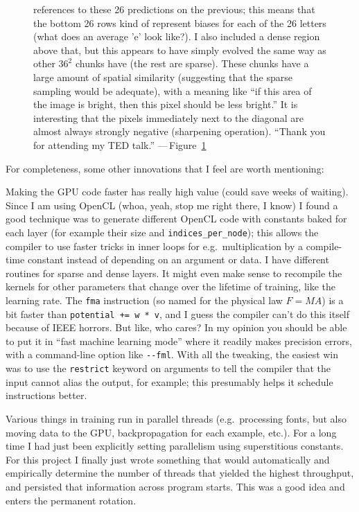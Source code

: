\documentclass[twocolumn]{article}
\begin{document}
\begin{figure}[ht!b]
{    references to these 26 predictions on the previous; this means
    that the bottom 26 rows kind of represent biases for each of the 26
    letters (what does an average 'e' look like?). I also included a
    dense region above that, but this appears to have simply evolved
    the same way as other $36^2$ chunks have (the rest are sparse).
    These chunks have a large amount of spatial similarity (suggesting
    that the sparse sampling would be adequate), with a meaning like
    ``if this area of the image is bright, then this pixel should
    be less bright.'' It is interesting that the pixels immediately
    next to the diagonal are almost always strongly negative
    (sharpening operation). ``Thank you for attending my TED talk.''
    ---\,Figure~\ref{fig:lastlayer}}
  \label{fig:lastlayer}
\end{figure}

For completeness, some other innovations that I feel are worth
mentioning:

Making the GPU code faster has really high value (could save weeks of
waiting). Since I am using OpenCL (whoa, yeah, stop me right there, I
know) I found a good technique was to generate different OpenCL code with
constants baked for each layer (for example their size and
\verb+indices_per_node+); this allows the compiler to use faster
tricks in inner loops for e.g.~multiplication by a compile-time constant
instead of depending on an argument or data. I have different routines
for sparse and dense layers. It might even make sense to recompile the
kernels for other parameters that change over the lifetime of
training, like the learning rate. The {\tt fma} instruction (so named
for the physical law $F=MA$) is a bit faster than
\verb|potential += w * v|, and I guess the compiler can't do this
itself because of IEEE horrors. But like, who cares? In my opinion you
should be able to put it in ``fast machine learning mode'' where it
readily makes precision errors, with a command-line option like
\verb+--fml+. With all the tweaking, the easiest win was to use the
{\tt restrict} keyword on arguments to tell the compiler that the
input cannot alias the output, for example; this presumably helps
it schedule instructions better.

Various things in training run in parallel threads (e.g.~processing
fonts, but also moving data to the GPU, backpropagation for each
example, etc.). For a long time I had just been explicitly setting
parallelism using superstitious constants. For this project I finally
just wrote something that would automatically and empirically
determine the number of threads that yielded the highest throughput,
and persisted that information across program starts. This was a
good idea and enters the permanent rotation.
\end{document}

